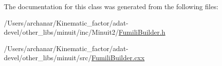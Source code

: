 The documentation for this class was generated from the following files\+:\begin{DoxyCompactItemize}
\item 
/\+Users/archanar/\+Kinematic\+\_\+factor/adat-\/devel/other\+\_\+libs/minuit/inc/\+Minuit2/\mbox{\hyperlink{adat-devel_2other__libs_2minuit_2inc_2Minuit2_2FumiliBuilder_8h}{Fumili\+Builder.\+h}}\item 
/\+Users/archanar/\+Kinematic\+\_\+factor/adat-\/devel/other\+\_\+libs/minuit/src/\mbox{\hyperlink{adat-devel_2other__libs_2minuit_2src_2FumiliBuilder_8cxx}{Fumili\+Builder.\+cxx}}\end{DoxyCompactItemize}

